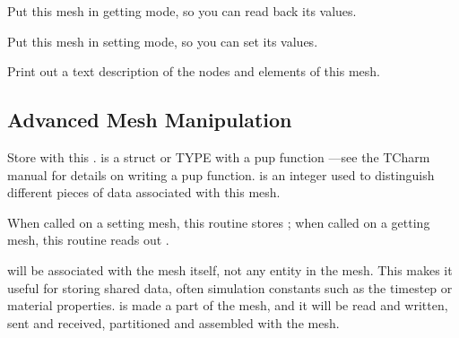 
Put this mesh in getting mode, so you can read back
its values.


Put this mesh in setting mode, so you can set its values.


Print out a text description of the nodes and elements 
of this mesh.


\subsection{Advanced Mesh Manipulation}


Store  with this .   is a struct or TYPE
with a pup function ---see the TCharm manual for details 
on writing a pup function.
 is an integer used to distinguish different pieces of data
associated with this mesh.

When called on a setting mesh, this routine stores ;
when called on a getting mesh, this routine reads out .

 will be associated with the mesh itself, not any 
entity in the mesh.  This makes it useful for storing shared
data, often simulation constants such as the timestep or material 
properties.   is made a part of the mesh, and it will be 
read and written, sent and received, partitioned and assembled
with the mesh.


  
